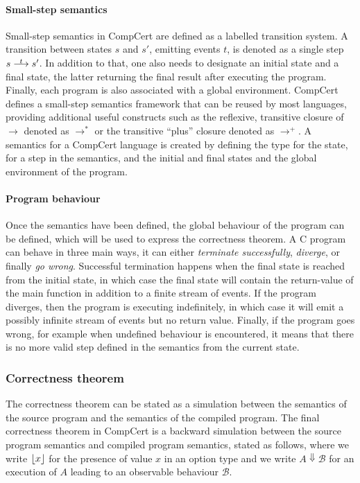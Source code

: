 \paragraph{Small-step semantics}

Small-step semantics in CompCert are defined as a labelled transition system.  A
transition between states $s$ and $s'$, emitting events $t$, is denoted as a
single step $s \oset{t}{\longrightarrow} s'$.  In addition to that, one also
needs to designate an initial state and a final state, the latter returning the
final result after executing the program.  Finally, each program is also
associated with a global environment.  CompCert defines a small-step semantics
framework that can be reused by most languages, providing additional useful
constructs such as the reflexive, transitive closure of $\longrightarrow$
denoted as $\longrightarrow^{*}$ or the transitive \enquote{plus} closure
denoted as $\longrightarrow^{+}$.  A semantics for a CompCert language is
created by defining the type for the state, for a step in the semantics, and the
initial and final states and the global environment of the program.

\paragraph{Program behaviour}

Once the semantics have been defined, the global behaviour of the program can be
defined, which will be used to express the correctness theorem.  A C program can
behave in three main ways, it can either \emph{terminate successfully},
\emph{diverge}, or finally \emph{go wrong}.  Successful termination happens when
the final state is reached from the initial state, in which case the final state
will contain the return-value of the main function in addition to a finite
stream of events.  If the program diverges, then the program is executing
indefinitely, in which case it will emit a possibly infinite stream of events
but no return value.  Finally, if the program goes wrong, for example when
undefined behaviour is encountered, it means that there is no more valid step
defined in the semantics from the current state.

\subsubsection{Correctness theorem}%
\label{sec:bg:correctness-theorem}

The correctness theorem can be stated as a simulation between the semantics of
the source program and the semantics of the compiled program.  The final
correctness theorem in CompCert is a backward simulation between the source
program semantics and compiled program semantics, stated as follows, where we
write $\lfloor x \rfloor$ for the presence of value $x$ in an option type and we write $A \Downarrow \mathcal{B}$ for an execution of $A$ leading to an observable behaviour $\mathcal{B}$.

